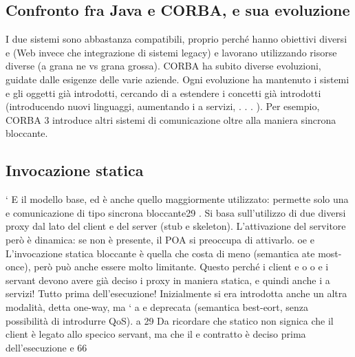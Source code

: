 \documentclass[a4paper,12pt]{article}
\begin{document}
\subsection{Confronto fra Java e CORBA, e sua evoluzione}
I due sistemi sono abbastanza compatibili, proprio perché hanno obiettivi diversi
e
(Web invece che integrazione di sistemi legacy) e lavorano utilizzando risorse
diverse (a grana ne vs grana grossa).
CORBA ha subito diverse evoluzioni, guidate dalle esigenze delle varie aziende.
Ogni evoluzione ha mantenuto i sistemi e gli oggetti già introdotti, cercando di
a
estendere i concetti già introdotti (introducendo nuovi linguaggi, aumentando i
a
servizi, . . . ). Per esempio, CORBA 3 introduce altri sistemi di comunicazione
oltre alla maniera sincrona bloccante.
\subsection{Invocazione statica}
`
E il modello base, ed è anche quello maggiormente utilizzato: permette solo una
e
comunicazione di tipo sincrona bloccante29 . Si basa sull'utilizzo di due diversi
proxy dal lato del client e del server (stub e skeleton). L'attivazione del servitore
però è dinamica: se non è presente, il POA si preoccupa di attivarlo.
oe
e
L'invocazione statica bloccante è quella che costa di meno (semantica ate
most-once), però può anche essere molto limitante. Questo perché i client e
o
o
e
i servant devono avere già deciso i proxy in maniera statica, e quindi anche i
a
servizi! Tutto prima dell'esecuzione!
Inizialmente si era introdotta anche un altra modalità, detta one-way, ma `
a
e
deprecata (semantica best-eort, senza possibilità di introdurre QoS).
a
29 Da ricordare che statico non signica che il client è legato allo specico servant, ma che il
e
contratto è deciso prima dell'esecuzione
e
66
\end{document}
